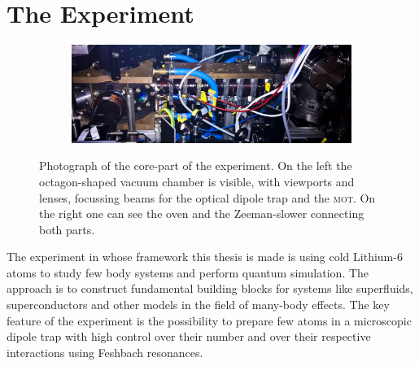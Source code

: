 \chapter{The Experiment}

\begin{figure}[h]
\centering
\begin{subfigure}[b]{0.8\textwidth}
                \includegraphics[width=\textwidth]{experiment}
\end{subfigure}
\caption{Photograph of the core-part of the experiment. On the left the octagon-shaped vacuum chamber is visible, with viewports and lenses, focussing beams for the optical dipole trap and the \textsc{mot}. On the right one can see the oven and the Zeeman-slower connecting both parts.}
\label{experiment}
\end{figure}
The experiment in whose framework this thesis is made is using cold Lithium-6 atoms to study few body systems and perform quantum simulation. The approach is to construct fundamental building blocks for systems like superfluids, superconductors and other models in the field of many-body effects. The key feature of the experiment is the possibility to prepare few atoms in a microscopic dipole trap with high control over their number and over their respective interactions using Feshbach resonances.

